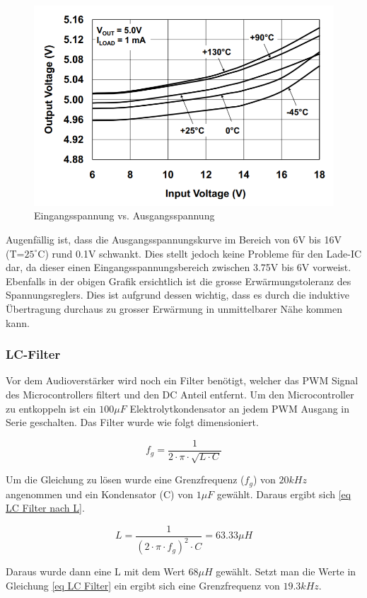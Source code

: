 \begin{figure}[H]
	\begin{center}
		\includegraphics[width=120mm]{data/Linearregler_5V.png}
		\caption[MCP1703A Linearregler Spannungsverhalten]{Eingangsspannung vs. Ausgangsspannung \cite{MCP1703LinearRegulator}} %
		\label{fig:Linearregler 5V}
	\end{center}
\end{figure} 

Augenfällig ist, dass die Ausgangsspannungskurve im Bereich von 6V bis 16V (T=$25^\circ\text{C}$) rund 0.1V schwankt. Dies stellt jedoch keine Probleme für den Lade-IC dar, da dieser einen Eingangsspannungsbereich zwischen 3.75V bis 6V vorweist. Ebenfalls in der obigen Grafik ersichtlich ist die grosse Erwärmungstoleranz des Spannungsreglers. Dies ist aufgrund dessen wichtig, dass es durch die induktive Übertragung durchaus zu grosser Erwärmung in unmittelbarer Nähe kommen kann.


\subsubsection{LC-Filter}
Vor dem Audioverstärker wird noch ein Filter benötigt, welcher das PWM Signal des Microcontrollers filtert und den DC Anteil entfernt. Um den Microcontroller zu entkoppeln ist ein $100\mu F$ Elektrolytkondensator an jedem PWM Ausgang in Serie geschalten. Das Filter wurde wie folgt dimensioniert. 

\begin{equation}
f_g = \frac{1}{2\cdot \pi \cdot \sqrt{L\cdot C}}
\label{eq LC Filter}
\end{equation}

Um die Gleichung zu lösen wurde eine Grenzfrequenz ($f_g$) von $20kHz$ angenommen und ein Kondensator (C) von $1\mu F$ gewählt. Daraus ergibt sich \autoref{eq LC Filter nach L}. 


\begin{equation}
L = \frac{1}{(2\cdot \pi \cdot f_g)^2\cdot C } = 63.33\mu H
\label{eq LC Filter nach L}
\end{equation}

Daraus wurde dann eine L mit dem Wert $68\mu H$ gewählt. Setzt man die Werte in Gleichung \ref{eq LC Filter} ein ergibt sich eine Grenzfrequenz von $19.3kHz$. 

